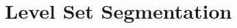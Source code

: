 \clearpage

\section{Level Set Segmentation}
\label{sec:LevelSetsSegmentation}
\ifitkFullVersion 

\fi







